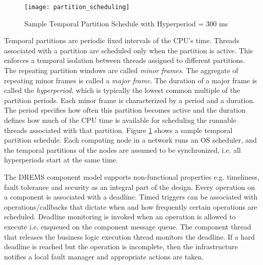 \begin{figure}[ht]
	\centering
	\texttt{[image: partition\_scheduling]}
	\caption{Sample Temporal Partition Schedule with Hyperperiod = 300 ms}
	\label{fig:partition_scheduling}
\end{figure}


Temporal partitions are periodic fixed intervals of the CPU's time. Threads associated with a partition are scheduled only when the partition is active. This enforces a temporal isolation between threads assigned to different partitions. The repeating partition windows are called \emph{minor frames}. The aggregate of repeating minor frames is called a \emph{major frame}. The duration of a major frame is called the \emph{hyperperiod}, which is typically the lowest common multiple of the partition periods. Each minor frame is characterized by a period and a duration. The period specifies how often this partition becomes active and the duration defines how much of the CPU time is available for scheduling the runnable threads associated with that partition. Figure \ref{fig:partition_scheduling} shows a sample temporal partition schedule. Each computing node in a network runs an OS scheduler, and the temporal partitions of the nodes are assumed to be synchronized, i.e. all hyperperiods start at the same time. 

The DREMS component model supports non-functional properties e.g. timeliness, fault tolerance and security as an integral part of the design. Every operation on a component is associated with a deadline. Timed triggers can be associated with operations/callbacks that dictate when and how frequently certain operations are scheduled. Deadline monitoring is invoked when an operation is allowed to execute i.e. enqueued on the component message queue. The component thread that releases the business logic execution thread monitors the deadline. If a hard deadline is reached but the operation is incomplete, then the infrastructure notifies a local fault manager and appropriate actions are taken. 

